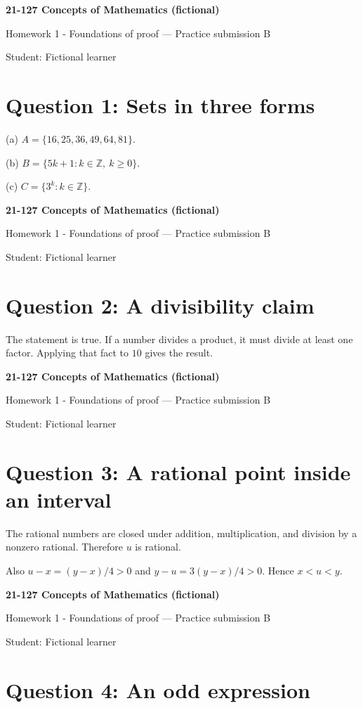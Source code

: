 \documentclass[11pt]{article}
\begin{document}
\textbf{21-127 Concepts of Mathematics (fictional)}

Homework 1 - Foundations of proof --- Practice submission B

Student: Fictional learner

\section*{Question 1: Sets in three forms}

(a) $A=\{16,25,36,49,64,81\}$.

(b) $B=\{5k+1:k\in\mathbb{Z},\ k\geq0\}$.

(c) $C=\{3^k:k\in\mathbb{Z}\}$.

\newpage
\textbf{21-127 Concepts of Mathematics (fictional)}

Homework 1 - Foundations of proof --- Practice submission B

Student: Fictional learner

\section*{Question 2: A divisibility claim}

The statement is true. If a number divides a product, it must divide at least one factor. Applying that fact to $10$ gives the result.

\newpage
\textbf{21-127 Concepts of Mathematics (fictional)}

Homework 1 - Foundations of proof --- Practice submission B

Student: Fictional learner

\section*{Question 3: A rational point inside an interval}

The rational numbers are closed under addition, multiplication, and division by a nonzero rational. Therefore $u$ is rational.

Also $u-x=(y-x)/4>0$ and $y-u=3(y-x)/4>0$. Hence $x<u<y$.

\newpage
\textbf{21-127 Concepts of Mathematics (fictional)}

Homework 1 - Foundations of proof --- Practice submission B

Student: Fictional learner

\section*{Question 4: An odd expression}
\end{document}
